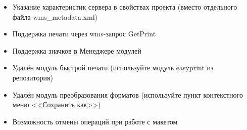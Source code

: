 
\begin{itemize}[label=--]
\item Указание характеристик сервера в свойствах проекта (вместо отдельного файла wms\_metadata.xml)
\item Поддержка печати через wms-запрос GetPrint
\end{itemize}


\begin{itemize}[label=--]
\item Поддержка значков в Менеджере модулей
\item Удалён модуль быстрой печати (используйте модуль easyprint из репозитория)
\item Удалён модуль преобразования форматов (используйте пункт контекстного
меню <<Сохранить как>>)
\end{itemize}


\begin{itemize}[label=--]
\item Возможность отмены операций при работе с макетом
\end{itemize}

\newpage
